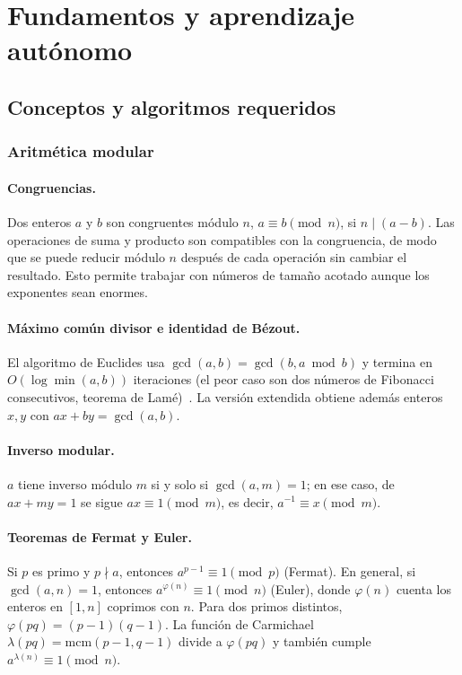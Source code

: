 \section{Fundamentos y aprendizaje autónomo}
\label{sec:fundamentos}

\subsection{Conceptos y algoritmos requeridos}

\subsubsection{Aritmética modular}

\paragraph{Congruencias.} Dos enteros $a$ y $b$ son congruentes módulo $n$,
$a \equiv b \pmod n$, si $n \mid (a-b)$. Las operaciones de suma y producto
son compatibles con la congruencia, de modo que se puede reducir módulo $n$
después de cada operación sin cambiar el resultado. Esto permite trabajar con
números de tamaño acotado aunque los exponentes sean enormes.

\paragraph{Máximo común divisor e identidad de Bézout.} El algoritmo de
Euclides usa $\gcd(a,b) = \gcd(b, a \bmod b)$ y termina en
$O(\log \min(a,b))$ iteraciones (el peor caso son dos números de Fibonacci
consecutivos, teorema de Lamé)~\cite{knuth,clrs}. La versión extendida
obtiene además enteros $x, y$ con $ax + by = \gcd(a,b)$.

\paragraph{Inverso modular.} $a$ tiene inverso módulo $m$ si y solo si
$\gcd(a, m) = 1$; en ese caso, de $ax + my = 1$ se sigue
$ax \equiv 1 \pmod m$, es decir, $a^{-1} \equiv x \pmod m$.

\paragraph{Teoremas de Fermat y Euler.} Si $p$ es primo y $p \nmid a$,
entonces $a^{p-1} \equiv 1 \pmod p$ (Fermat). En general, si
$\gcd(a,n) = 1$, entonces $a^{\varphi(n)} \equiv 1 \pmod n$ (Euler), donde
$\varphi(n)$ cuenta los enteros en $[1,n]$ coprimos con $n$. Para dos primos
distintos, $\varphi(pq) = (p-1)(q-1)$. La función de Carmichael
$\lambda(pq) = \mathrm{mcm}(p-1, q-1)$ divide a $\varphi(pq)$ y también cumple
$a^{\lambda(n)} \equiv 1 \pmod n$.

